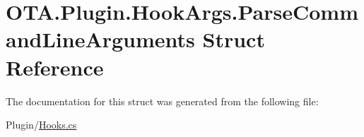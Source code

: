 \hypertarget{struct_o_t_a_1_1_plugin_1_1_hook_args_1_1_parse_command_line_arguments}{}\section{O\+T\+A.\+Plugin.\+Hook\+Args.\+Parse\+Command\+Line\+Arguments Struct Reference}
\label{struct_o_t_a_1_1_plugin_1_1_hook_args_1_1_parse_command_line_arguments}


The documentation for this struct was generated from the following file\+:\begin{DoxyCompactItemize}
\item 
Plugin/\hyperlink{_hooks_8cs}{Hooks.\+cs}\end{DoxyCompactItemize}
